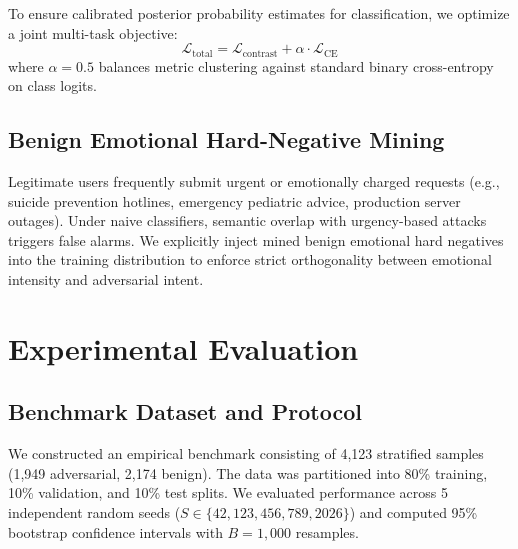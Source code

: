 \documentclass[journal]{IEEEtran}
\begin{document}
To ensure calibrated posterior probability estimates for classification, we optimize a joint multi-task objective:
\begin{equation}
\mathcal{L}_{\text{total}} = \mathcal{L}_{\text{contrast}} + \alpha \cdot \mathcal{L}_{\text{CE}}
\end{equation}
where $\alpha = 0.5$ balances metric clustering against standard binary cross-entropy on class logits.

\subsection{Benign Emotional Hard-Negative Mining}
Legitimate users frequently submit urgent or emotionally charged requests (e.g., suicide prevention hotlines, emergency pediatric advice, production server outages). Under naive classifiers, semantic overlap with urgency-based attacks triggers false alarms. We explicitly inject mined benign emotional hard negatives into the training distribution to enforce strict orthogonality between emotional intensity and adversarial intent.

\section{Experimental Evaluation}

\subsection{Benchmark Dataset and Protocol}
We constructed an empirical benchmark consisting of 4,123 stratified samples (1,949 adversarial, 2,174 benign). The data was partitioned into 80\% training, 10\% validation, and 10\% test splits. We evaluated performance across 5 independent random seeds ($S \in \{42, 123, 456, 789, 2026\}$) and computed 95\% bootstrap confidence intervals with $B = 1,000$ resamples.
\end{document}
